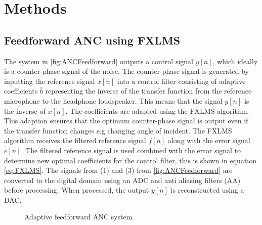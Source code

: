 \section{Methods}
\subsection{Feedforward ANC using FXLMS}


The system in \autoref{fig:ANCFeedforward} outputs a control signal $y[n]$, which ideally is a counter-phase signal of the noise. The counter-phase signal is generated by inputting the reference signal $x[n]$ into a control filter consisting of adaptive coefficients $\bar{b}$ representing the inverse of the transfer function from the reference microphone to the headphone loudspeaker. This means that the signal $y[n]$ is the inverse of $x[n]$. The coefficients are adapted using the FXLMS algorithm. This adaption ensures that the optimum counter-phase signal is output even if the transfer function changes e.g changing angle of incident. The FXLMS algorithm receives the filtered reference signal $f[n]$ along with the error signal $e[n]$. The filtered reference signal is used combined with the error signal to determine new optimal coefficients for the control filter, this is shown in equation \ref{eq:FXLMS}. The signals from (1) and (3) from \autoref{fig:ANCFeedforward} are converted to the digital domain using an ADC and anti aliasing filters (AA) before processing. When processed, the output $y[n]$ is reconstructed using a DAC.


\begin{figure}[H]
		
	\caption{Adaptive feedforward ANC system.}
	\label{fig:ANCFeedforward}
\end{figure}



